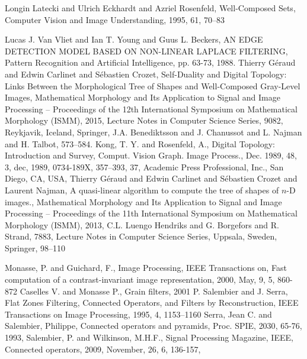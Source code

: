 \documentclass[12pt,a4paper]{report}
\begin{document}
\begin{thebibliography}{9}
    {Longin Latecki and Ulrich Eckhardt and Azriel Rosenfeld},
    {Well-Composed Sets},
    {Computer Vision and Image Understanding},
    {1995},
    {61},
    {70--83}
    
	{Lucas J. Van Vliet and Ian T. Young and Guus L. Beckers},
    {AN EDGE DETECTION MODEL BASED ON NON-LINEAR LAPLACE FILTERING},
    Pattern Recognition and Artificial Intelligence,
    pp. 63-73,
    1988.  
  {Thierry G\'eraud and Edwin Carlinet and S\'ebastien Crozet},
  {Self-Duality and Digital Topology: Links Between the
		  Morphological Tree of Shapes and Well-Composed Gray-Level
		  Images},
  {Mathematical Morphology and Its Application to Signal and
		  Image Processing -- Proceedings of the 12th International
		  Symposium on Mathematical Morphology (ISMM)},
  {2015},
  {Lecture Notes in Computer Science Series},
  {9082},
  {Reykjavik, Iceland},
  {Springer},
  {J.A. Benediktsson and J. Chanussot and L. Najman and H.
		  Talbot},
  {573--584}.
	{Kong, T. Y. and Rosenfeld, A.},
	{Digital Topology: Introduction and Survey},
	{Comput. Vision Graph. Image Process.},
	{Dec. 1989},
	{48},
	{3},
	dec,
	{1989},
	{0734-189X},
	{357--393},
	{37},
	{Academic Press Professional, Inc.},
	{San Diego, CA, USA},    
  	{Thierry G\'eraud and Edwin Carlinet and S\'ebastien Crozet
		  and Laurent Najman},
  	{A quasi-linear algorithm to compute the tree of shapes of
	{$n$-D} images.},
	{Mathematical Morphology and Its Application to Signal and
		  Image Processing -- Proceedings of the 11th International
		  Symposium on Mathematical Morphology (ISMM)},
	2013,
	{C.L. Luengo Hendriks and G. Borgefors and R. Strand},
	7883,
	{Lecture Notes in Computer Science Series},
	{Uppsala, Sweden},
	{Springer},
	{98--110}
  	
	{Monasse, P. and Guichard, F.},
	{Image Processing, IEEE Transactions on},
	{Fast computation of a contrast-invariant image representation},
	{2000},
	{May},
	{9},
	{5},
	{860-872}
    {Caselles V. and Monasse P.},
    {Grain filters},
    {2001}	
    {P. Salembier and J. Serra},
    {Flat Zones Filtering, Connected Operators, and Filters by Reconstruction},
    {IEEE Transactions on Image Processing},
    {1995},
    {4},
    {1153--1160}
	{Serra, Jean C. and Salembier, Philippe},
	{Connected operators and pyramids},
	{Proc. SPIE},
	{2030},
	{65-76},
	{1993},
	{Salembier, P. and Wilkinson, M.H.F.},
	{Signal Processing Magazine, IEEE},
	{Connected operators},
	{2009},
	{November},
	{26},
	{6},
	{136-157}, 
\end{thebibliography}
\end{document}
